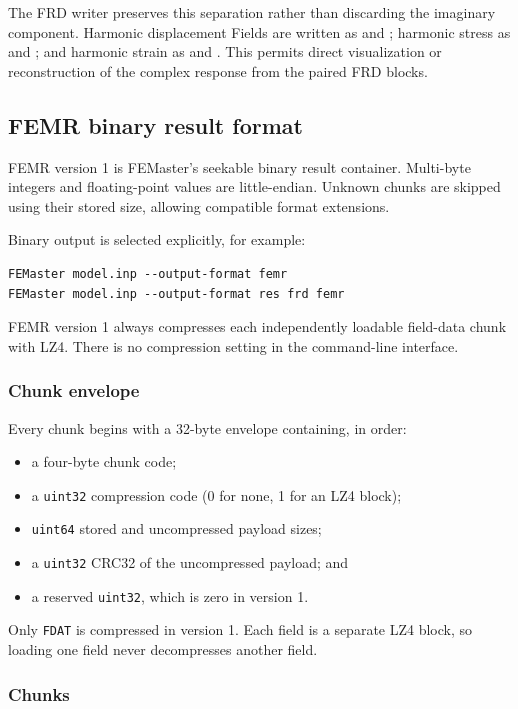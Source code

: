 The FRD writer preserves this separation rather than discarding the imaginary component. Harmonic displacement Fields are written as  and ; harmonic stress as  and ; and harmonic strain as  and . This permits direct visualization or reconstruction of the complex response from the paired FRD blocks.

\subsection{FEMR binary result format}
\label{sec:femr-format}

FEMR version 1 is FEMaster's seekable binary result container. Multi-byte integers and floating-point values are little-endian. Unknown chunks are skipped using their stored size, allowing compatible format extensions.

Binary output is selected explicitly, for example:
\begin{verbatim}
FEMaster model.inp --output-format femr
FEMaster model.inp --output-format res frd femr
\end{verbatim}
FEMR version 1 always compresses each independently loadable field-data chunk with LZ4. There is no compression setting in the command-line interface.

\subsubsection{Chunk envelope}

Every chunk begins with a 32-byte envelope containing, in order:
\begin{itemize}
  \item a four-byte chunk code;
  \item a \texttt{uint32} compression code (0 for none, 1 for an LZ4 block);
  \item \texttt{uint64} stored and uncompressed payload sizes;
  \item a \texttt{uint32} CRC32 of the uncompressed payload; and
  \item a reserved \texttt{uint32}, which is zero in version 1.
\end{itemize}
Only \texttt{FDAT} is compressed in version 1. Each field is a separate LZ4 block, so loading one field never decompresses another field.

\subsubsection{Chunks}

